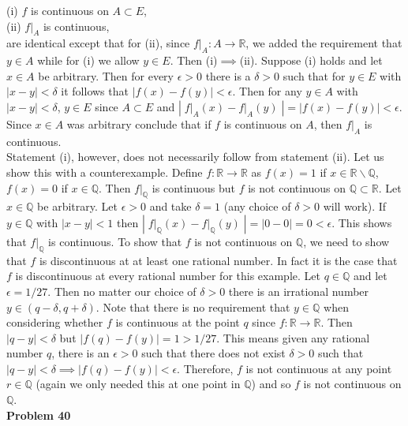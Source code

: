 \documentclass[a4paper]{article}
\begin{document}
(i) $f$ is continuous on $A \subset E$,\\
(ii) $f\rvert_A$ is continuous,\\

are identical except that for (ii), since $f\rvert_A : A \rightarrow \mathbb{R}$, we added the requirement that $y \in A$ while for (i) we allow $y \in E$. Then (i)$\implies$(ii). Suppose (i) holds and let $x \in A$ be arbitrary. Then for every $\epsilon > 0$ there is a $\delta>0$ such that for $y \in E$ with $|x-y|<\delta$ it follows that $|f(x) - f(y)| < \epsilon$. Then for any $y \in A$ with $|x-y|<\delta$, $y \in E$ since $A \subset E$ and $|\;f\rvert_A(x) - f\rvert_A(y)\;| = |f(x) - f(y)| < \epsilon$. Since $x \in A$ was arbitrary conclude that if $f$ is continuous on $A$, then $f\rvert_A$ is continuous. \\

Statement (i), however, does not necessarily follow from statement (ii). Let us show this with a counterexample. Define $f : \mathbb{R} \rightarrow \mathbb{R}$ as $f(x) = 1$ if $x \in \mathbb{R} \backslash \mathbb{Q}$, $f(x) = 0$ if $x \in \mathbb{Q}$. Then $f\rvert_\mathbb{Q}$ is continuous but $f$ is not continuous on $\mathbb{Q}\subset \mathbb{R}$. Let $x \in \mathbb{Q}$ be arbitrary. Let $\epsilon > 0$ and take $\delta = 1$ (any choice of $\delta > 0$ will work). If $y \in \mathbb{Q}$ with $|x-y|<1$ then $|\;f\rvert_\mathbb{Q}(x) - f\rvert_\mathbb{Q}(y)\;| = |0 - 0| = 0 <\epsilon$. This shows that $f\rvert_\mathbb{Q}$ is continuous. To show that $f$ is not continuous on $\mathbb{Q}$, we need to show that $f$ is discontinuous at at least one rational number. In fact it is the case that $f$ is discontinuous at every rational number for this example. Let $q \in \mathbb{Q}$ and let $\epsilon = 1/27$. Then no matter our choice of $\delta > 0$ there is an irrational number $ y \in (q-\delta, q+\delta)$. Note that there is no requirement that $y \in \mathbb{Q}$ when considering whether $f$ is continuous at the point $q$ since $f:\mathbb{R}\rightarrow \mathbb{R}$.  Then $|q-y| < \delta$ but $|f(q) - f(y)| = 1>1/27$. This means given any rational number $q$, there is an $\epsilon > 0$ such that there does not exist $\delta > 0$ such that $|q- y| < \delta \implies |f(q) - f(y)| < \epsilon$. Therefore, $f$ is not continuous at any point $r \in \mathbb{Q}$ (again we only needed this at one point in $\mathbb{Q}$) and so $f$ is not continuous on $\mathbb{Q}$. \\

{\bf Problem 40}
\end{document}
